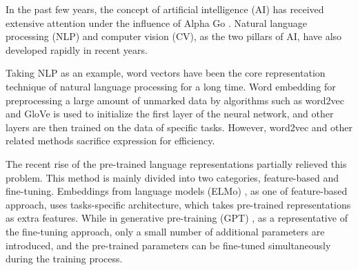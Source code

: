 \documentclass[10pt,journal,compsoc]{IEEEtran}
\begin{document}
\maketitle


\IEEEdisplaynontitleabstractindextext



%
\IEEEpeerreviewmaketitle




In the past few years, the concept of artificial intelligence (AI) has received extensive attention under the influence of Alpha Go \cite{silver2016mastering} \cite{silver2017mastering}. Natural language processing (NLP) and computer vision (CV), as the two pillars of AI, have also developed rapidly in recent years.

Taking NLP as an example, word vectors have been the core representation technique of natural language processing for a long time. Word embedding for preprocessing a large amount of unmarked data by algorithms such as word2vec \cite{mikolov2013efficient} and GloVe \cite{pennington2014glove} is used to initialize the first layer of the neural network, and other layers are then trained on the data of specific tasks. However, word2vec and other related methods sacrifice expression for efficiency.

The recent rise of the pre-trained language representations partially relieved this problem. This method is mainly divided into two categories, feature-based and fine-tuning. Embeddings from language models (ELMo) \cite{peters2018deep}, as one of feature-based approach, uses tasks-specific architecture, which takes pre-trained representations as extra features. While in generative pre-training (GPT) \cite{radford2018improving}, as a representative of the fine-tuning approach, only a small number of additional parameters are introduced, and the pre-trained parameters can be fine-tuned simultaneously during the training process.
\end{document}
